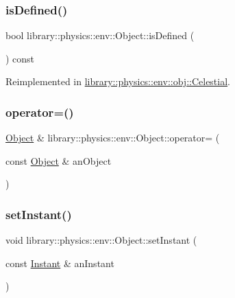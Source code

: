 \subsubsection{\texorpdfstring{is\+Defined()}{isDefined()}}
{\footnotesize\ttfamily bool library\+::physics\+::env\+::\+Object\+::is\+Defined (\begin{DoxyParamCaption}{ }\end{DoxyParamCaption}) const\hspace{0.3cm}{\ttfamily [virtual]}}



Reimplemented in \hyperlink{classlibrary_1_1physics_1_1env_1_1obj_1_1_celestial_a2b16a76f609891450356457de13c26d8}{library\+::physics\+::env\+::obj\+::\+Celestial}.

\mbox{\label{classlibrary_1_1physics_1_1env_1_1_object_a1e7d9e24f984bcc13e89625805ae15aa}} 
\subsubsection{\texorpdfstring{operator=()}{operator=()}}
{\footnotesize\ttfamily \hyperlink{classlibrary_1_1physics_1_1env_1_1_object}{Object} \& library\+::physics\+::env\+::\+Object\+::operator= (\begin{DoxyParamCaption}\item[{const \hyperlink{classlibrary_1_1physics_1_1env_1_1_object}{Object} \&}]{an\+Object }\end{DoxyParamCaption})}

\mbox{\label{classlibrary_1_1physics_1_1env_1_1_object_a6a215fef40593ef3dae3bf2b681339d2}} 
\subsubsection{\texorpdfstring{set\+Instant()}{setInstant()}}
{\footnotesize\ttfamily void library\+::physics\+::env\+::\+Object\+::set\+Instant (\begin{DoxyParamCaption}\item[{const \hyperlink{classlibrary_1_1physics_1_1time_1_1_instant}{Instant} \&}]{an\+Instant }\end{DoxyParamCaption})}



